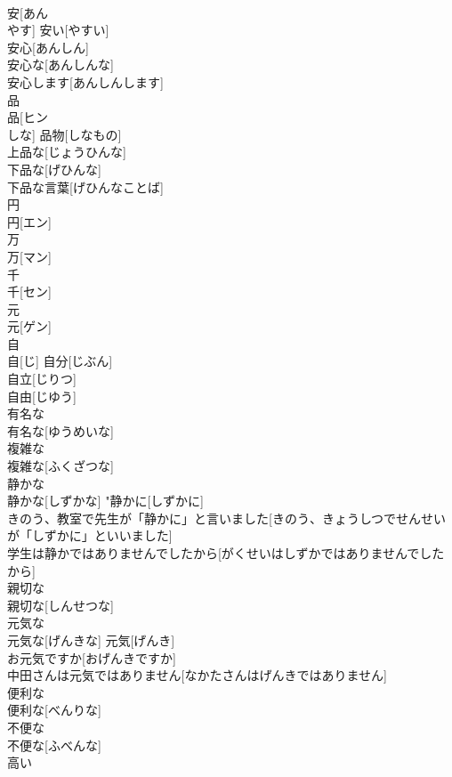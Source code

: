 \documentclass[8pt]{extreport}
\begin{document}
\begin{CJK}{UTF8}{min}
\\	安[あん 
\\	やす]	安い[やすい] 
\\	安心[あんしん] 
\\	安心な[あんしんな] 
\\	安心します[あんしんします] 
\\	品	
\\	品[ヒン 
\\	しな]	品物[しなもの] 
\\	上品な[じょうひんな] 
\\	下品な[げひんな] 
\\	下品な言葉[げひんなことば] 
\\	円	
\\	円[エン]	
\\	万	
\\	万[マン]	
\\	千	
\\	千[セン]	
\\	元	
\\	元[ゲン]	
\\	自	
\\	自[じ]	自分[じぶん] 
\\	自立[じりつ] 
\\	自由[じゆう] 
\\	有名な	
\\	有名な[ゆうめいな]	
\\	複雑な	
\\	複雑な[ふくざつな]	
\\	静かな	
\\	静かな[しずかな]	"静かに[しずかに] 
\\	きのう、教室で先生が「静かに」と言いました[きのう、きょうしつでせんせいが「しずかに」といいました] 
\\	学生は静かではありませんでしたから[がくせいはしずかではありませんでしたから] 
\\	親切な	
\\	親切な[しんせつな]	
\\	元気な	
\\	元気な[げんきな]	元気[げんき] 
\\	お元気ですか[おげんきですか] 
\\	中田さんは元気ではありません[なかたさんはげんきではありません] 
\\	便利な	
\\	便利な[べんりな]	
\\	不便な	
\\	不便な[ふべんな]	
\\	高い	

\end{CJK}
\end{document}
